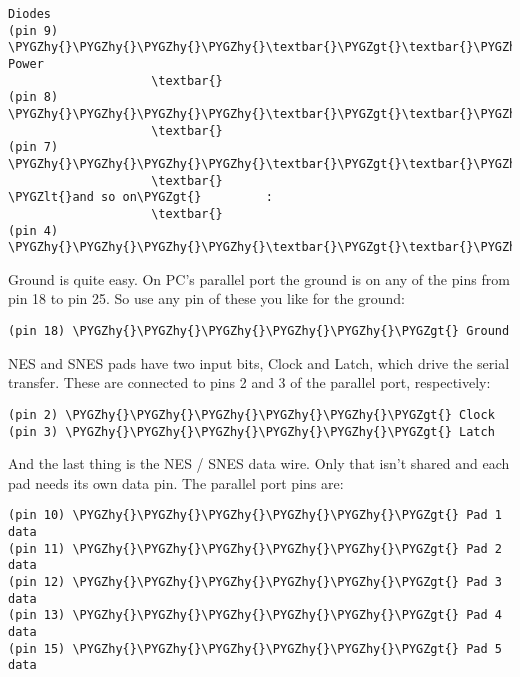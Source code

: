 \documentclass[a4paper,8pt,english]{sphinxmanual}
\def\PYGZlt{\char`\<}
\def\PYGZgt{\char`\>}
\def\PYGZhy{\char`\-}
\begin{document}
\begin{Verbatim}[commandchars=\\\{\}]
          Diodes
(pin 9) \PYGZhy{}\PYGZhy{}\PYGZhy{}\PYGZhy{}\textbar{}\PYGZgt{}\textbar{}\PYGZhy{}\PYGZhy{}\PYGZhy{}\PYGZhy{}\PYGZhy{}\PYGZhy{}\PYGZhy{}+\PYGZhy{}\PYGZhy{}\PYGZhy{}\PYGZhy{}\PYGZhy{}\PYGZhy{}\PYGZgt{} Power
                    \textbar{}
(pin 8) \PYGZhy{}\PYGZhy{}\PYGZhy{}\PYGZhy{}\textbar{}\PYGZgt{}\textbar{}\PYGZhy{}\PYGZhy{}\PYGZhy{}\PYGZhy{}\PYGZhy{}\PYGZhy{}\PYGZhy{}+
                    \textbar{}
(pin 7) \PYGZhy{}\PYGZhy{}\PYGZhy{}\PYGZhy{}\textbar{}\PYGZgt{}\textbar{}\PYGZhy{}\PYGZhy{}\PYGZhy{}\PYGZhy{}\PYGZhy{}\PYGZhy{}\PYGZhy{}+
                    \textbar{}
\PYGZlt{}and so on\PYGZgt{}         :
                    \textbar{}
(pin 4) \PYGZhy{}\PYGZhy{}\PYGZhy{}\PYGZhy{}\textbar{}\PYGZgt{}\textbar{}\PYGZhy{}\PYGZhy{}\PYGZhy{}\PYGZhy{}\PYGZhy{}\PYGZhy{}\PYGZhy{}+
\end{Verbatim}

Ground is quite easy. On PC's parallel port the ground is on any of the
pins from pin 18 to pin 25. So use any pin of these you like for the ground:

\begin{Verbatim}[commandchars=\\\{\}]
(pin 18) \PYGZhy{}\PYGZhy{}\PYGZhy{}\PYGZhy{}\PYGZhy{}\PYGZgt{} Ground
\end{Verbatim}

NES and SNES pads have two input bits, Clock and Latch, which drive the
serial transfer. These are connected to pins 2 and 3 of the parallel port,
respectively:

\begin{Verbatim}[commandchars=\\\{\}]
(pin 2) \PYGZhy{}\PYGZhy{}\PYGZhy{}\PYGZhy{}\PYGZhy{}\PYGZgt{} Clock
(pin 3) \PYGZhy{}\PYGZhy{}\PYGZhy{}\PYGZhy{}\PYGZhy{}\PYGZgt{} Latch
\end{Verbatim}

And the last thing is the NES / SNES data wire. Only that isn't shared and
each pad needs its own data pin. The parallel port pins are:

\begin{Verbatim}[commandchars=\\\{\}]
(pin 10) \PYGZhy{}\PYGZhy{}\PYGZhy{}\PYGZhy{}\PYGZhy{}\PYGZgt{} Pad 1 data
(pin 11) \PYGZhy{}\PYGZhy{}\PYGZhy{}\PYGZhy{}\PYGZhy{}\PYGZgt{} Pad 2 data
(pin 12) \PYGZhy{}\PYGZhy{}\PYGZhy{}\PYGZhy{}\PYGZhy{}\PYGZgt{} Pad 3 data
(pin 13) \PYGZhy{}\PYGZhy{}\PYGZhy{}\PYGZhy{}\PYGZhy{}\PYGZgt{} Pad 4 data
(pin 15) \PYGZhy{}\PYGZhy{}\PYGZhy{}\PYGZhy{}\PYGZhy{}\PYGZgt{} Pad 5 data
\end{Verbatim}
\end{document}
